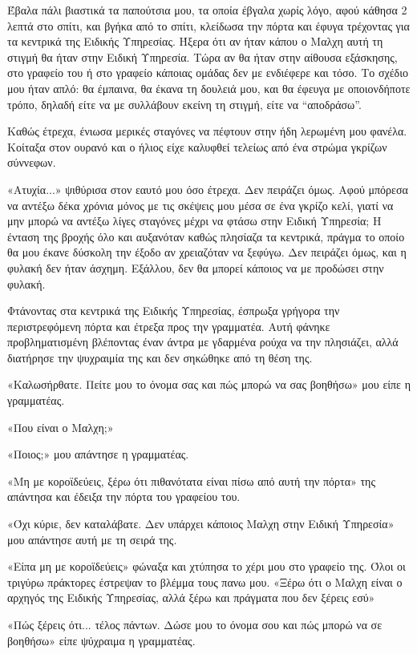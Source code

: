 \documentclass[12pt,twoside, openany]{book}
\begin{document}
Έβαλα πάλι βιαστικά τα παπούτσια μου, τα οποία έβγαλα χωρίς λόγο, αφού κάθησα 2 λεπτά στο σπίτι, και βγήκα από το σπίτι, κλείδωσα την πόρτα και έφυγα τρέχοντας για τα κεντρικά της Ειδικής Υπηρεσίας. Ήξερα ότι αν ήταν κάπου ο Μαλχη αυτή τη στιγμή θα ήταν στην Ειδική Υπηρεσία. Τώρα αν θα ήταν στην αίθουσα εξάσκησης, στο γραφείο του ή στο γραφείο κάποιας ομάδας δεν με ενδιέφερε και τόσο. Το σχέδιο μου ήταν απλό: θα έμπαινα, θα έκανα τη δουλειά μου, και θα έφευγα με οποιονδήποτε τρόπο, δηλαδή είτε να με συλλάβουν εκείνη τη στιγμή, είτε να “αποδράσω”.

Καθώς έτρεχα, ένιωσα μερικές σταγόνες να πέφτουν στην ήδη λερωμένη μου φανέλα. Κοίταξα στον ουρανό και ο ήλιος είχε καλυφθεί τελείως από ένα στρώμα γκρίζων σύννεφων.

«Ατυχία...» ψιθύρισα στον εαυτό μου όσο έτρεχα. Δεν πειράζει όμως. Αφού μπόρεσα να αντέξω δέκα χρόνια μόνος με τις σκέψεις μου μέσα σε ένα γκρίζο κελί, γιατί να μην μπορώ να αντέξω λίγες σταγόνες μέχρι να φτάσω στην Ειδική Υπηρεσία; Η ένταση της βροχής όλο και αυξανόταν καθώς πλησίαζα τα κεντρικά, πράγμα το οποίο θα μου έκανε δύσκολη την έξοδο αν χρειαζόταν να ξεφύγω. Δεν πειράζει όμως, και η φυλακή δεν ήταν άσχημη. Εξάλλου, δεν θα μπορεί κάποιος να με προδώσει στην φυλακή.

Φτάνοντας στα κεντρικά της Ειδικής Υπηρεσίας, έσπρωξα γρήγορα την περιστρεφόμενη πόρτα και έτρεξα προς την γραμματέα. Αυτή φάνηκε προβληματισμένη βλέποντας έναν άντρα με γδαρμένα ρούχα να την πλησιάζει, αλλά διατήρησε την ψυχραιμία της και δεν σηκώθηκε από τη θέση της.

«Καλωσήρθατε. Πείτε μου το όνομα σας και πώς μπορώ να σας βοηθήσω» μου είπε η γραμματέας.

«Που είναι ο Μαλχη;»

«Ποιος;» μου απάντησε η γραμματέας.

«Μη με κοροϊδεύεις, ξέρω ότι πιθανότατα είναι πίσω από αυτή την πόρτα» της απάντησα και έδειξα την πόρτα του γραφείου του.

«Όχι κύριε, δεν καταλάβατε. Δεν υπάρχει κάποιος Μαλχη στην Ειδική Υπηρεσία» μου απάντησε αυτή με τη σειρά της.

«Είπα μη με κοροϊδεύεις» φώναξα και χτύπησα το χέρι μου στο γραφείο της. Όλοι οι τριγύρω πράκτορες έστρεψαν το βλέμμα τους πανω μου. «Ξέρω ότι ο Μαλχη είναι ο αρχηγός της Ειδικής Υπηρεσίας, αλλά ξέρω και πράγματα που δεν ξέρεις εσύ»

«Πώς ξέρεις ότι... τέλος πάντων. Δώσε μου το όνομα σου και πώς μπορώ να σε βοηθήσω» είπε ψύχραιμα η γραμματέας.
\end{document}
